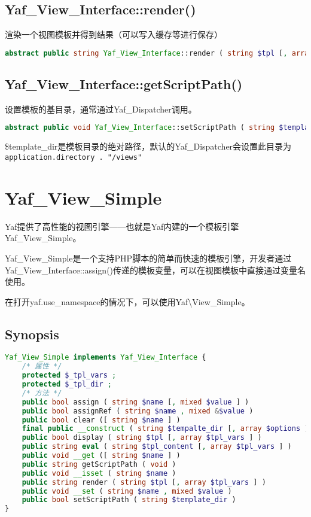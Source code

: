 \section{Yaf\_View\_Interface::render()}

渲染一个视图模板并得到结果（可以写入缓存等进行保存）

\begin{lstlisting}[language=PHP]
abstract public string Yaf_View_Interface::render ( string $tpl [, array $tpl_vars ] )
\end{lstlisting}


\section{Yaf\_View\_Interface::getScriptPath()}

设置模板的基目录，通常通过Yaf\_Dispatcher调用。



\begin{lstlisting}[language=PHP]
abstract public void Yaf_View_Interface::setScriptPath ( string $template_dir )
\end{lstlisting}


\$template\_dir是模板目录的绝对路径，默认的Yaf\_Dispatcher会设置此目录为\texttt{application.directory . "/views"}

\chapter{Yaf\_View\_Simple}



Yaf提供了高性能的视图引擎——也就是Yaf内建的一个模板引擎Yaf\_View\_Simple。

Yaf\_View\_Simple是一个支持PHP脚本的简单而快速的模板引擎，开发者通过Yaf\_View\_Interface::assign()传递的模板变量，可以在视图模板中直接通过变量名使用。

在打开yaf.use\_namespace的情况下，可以使用Yaf\textbackslash View\_Simple。


\section{Synopsis}


\begin{lstlisting}[language=PHP]
Yaf_View_Simple implements Yaf_View_Interface {
    /* 属性 */
    protected $_tpl_vars ;
    protected $_tpl_dir ;
    /* 方法 */
    public bool assign ( string $name [, mixed $value ] )
    public bool assignRef ( string $name , mixed &$value )
    public bool clear ([ string $name ] )
    final public __construct ( string $tempalte_dir [, array $options ] )
    public bool display ( string $tpl [, array $tpl_vars ] )
    public string eval ( string $tpl_content [, array $tpl_vars ] )
    public void __get ([ string $name ] )
    public string getScriptPath ( void )
    public void __isset ( string $name )
    public string render ( string $tpl [, array $tpl_vars ] )
    public void __set ( string $name , mixed $value )
    public bool setScriptPath ( string $template_dir )
}
\end{lstlisting}

